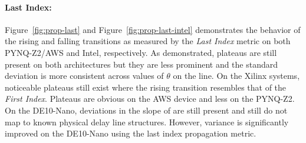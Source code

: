 

\paragraph{Last Index: }
\label{last_transition}
Figure~\ref{fig:prop-last} and Figure~\ref{fig:prop-last-intel} demonstrates the behavior of the rising and falling transitions as measured by the \textit{Last Index} metric on both PYNQ-Z2/AWS and Intel, respectively. As demonstrated, plateaus are still present on both architectures but they are less prominent and the standard deviation is more consistent across values of $\theta$ on the line. On the Xilinx systems, noticeable plateaus still exist where the rising transition resembles that of the \textit{First Index}. Plateaus are obvious on the AWS device and less on the PYNQ-Z2. On the DE10-Nano, deviations in the slope of are still present and still do not map to known physical delay line structures. However, variance is significantly improved on the DE10-Nano using the last index propagation metric.

